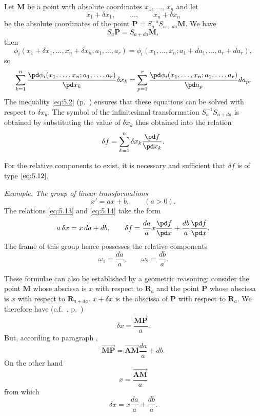 Let $\mathbf{M}$ be a point with absolute coordinates $x_{1}$, $\dots$, $x_{n}$ and let
\[
x_{1}+\delta x_{1},\qquad \dots,\qquad x_{n}+\delta x_{n}
\]
be the absolute coordinates of the point $\mathbf{P}=S_{a}^{-a}S_{a+da}\mathbf{M}$. We have
\[
S_{a}\mathbf{P}=S_{a+da}\mathbf{M},
\]
then
\[
\phi_{i}(x_{1}+\delta x_{1},\dots,x_{n}+\delta x_{n};a_{1},\dots,a_{r})=\phi_{i}(x_{1},\dots,x_{n};a_{1}+da_{1},\dots,a_{r}+da_{r}),
\]
so
\begin{equation}
  \label{eq:5.13}
  \sum_{k=1}^{n}\frac{\pd \phi_{i}(x_{1},\dots,x_{n};a_{1},\dots,a_{r})}{\pd x_{k}}\delta x_{k}=\sum_{p=1}^{r}\frac{\pd \phi_{i}(x_{1},\dots,x_{n};a_{1},\dots,a_{r})}{\pd a_{p}}da_{p}.
\end{equation}
The inequality \eqref{eq:5.2} (p.~\pageref{eq:5.2}) ensures that these equations can be solved with respect to $\delta x_{k}$. The symbol of the infinitesimal transformation $S_{a}^{-1}S_{a+da}$ is obtained by substituting the value of $\delta x_{k}$ thus obtained into the relation
\begin{equation}
  \label{eq:5.14}
  \delta f=\sum_{k=1}^{n}\delta x_{k}\frac{\pd f}{\pd x_{k}}.
\end{equation}

For the relative components to exist, it is necessary and sufficient that $\delta f$ is of type $\eqref{eq:5.12}$.

\somespace

{\small
\emph{Example. The group of linear transformations}
\[
x'=ax+b,\qquad(a>0).
\]
The relations \eqref{eq:5.13} and \eqref{eq:5.14} take the form
\[
a\,\delta x=x\,da+db,\qquad\delta f=\frac{da}{a}x\frac{\pd f}{\pd x}+\frac{db}{a}\frac{\pd f}{\pd x}.
\]
The frame of this group hence possesses the relative components
\[
\omega_{1}=\frac{da}{a},\qquad\omega_{2}=\frac{db}{a}.
\]

These formulae can also be established by a geometric reasoning: consider the point $\mathbf{M}$ whose abscissa is $x$ with respect to $\mathbf{R}_{a}$ and the point $\mathbf{P}$ whose abscissa is $x$ with respect to $\mathbf{R}_{a+da}$. $x+\delta x$ is the abscissa of $\mathbf{P}$ with respect to $\mathbf{R}_{a}$. We therefore have (c.f.~, p.~\pageref{sec:64})
\[
\delta x=\frac{\overrightarrow{\mathbf{MP}}}{a}.
\]
But, according to paragraph ,
\[
\overrightarrow{\mathbf{MP}}=\overrightarrow{\mathbf{AM}}\frac{da}{a}+db.
\]
On the other hand
\[
x=\frac{\overrightarrow{\mathbf{AM}}}{a}
\]
from which
\[
\delta x=x\frac{da}{a}+\frac{db}{a}.
\]
}

